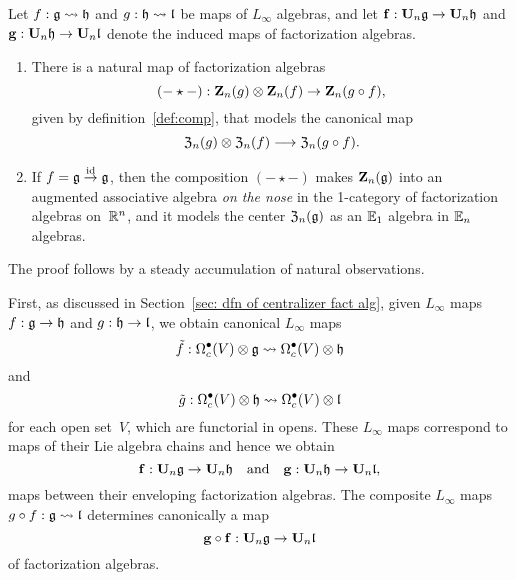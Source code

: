 \documentclass[11pt]{amsart}
\numberwithin{equation}{section}
\begin{document}
\begin{thm}
\label{T:compcentralizer}
Let $f: \mathfrak g \rightsquigarrow \mathfrak h$ and $g: \mathfrak h \rightsquigarrow \mathfrak l$ be maps of  $L_\infty$ algebras,
and let $\bold{f}: \mathbf U_n \mathfrak g \to \mathbf U_n \mathfrak h$ and $\bold{g}: \mathbf U_n \mathfrak h \to \mathbf U_n \mathfrak l$ denote the induced maps of factorization algebras.
\begin{enumerate} 
\item There is a natural map of factorization algebras
\[
(-\star-) : \mathbf Z_n(g) \otimes \mathbf Z_n(f) \to \mathbf Z_n(g \circ f),
\]
given by definition~\ref{def:comp}, 
that models the canonical map 
\[
{\frak Z}_n(g) \otimes {\frak Z}_n(f) \longrightarrow {\frak Z}_n(g\circ f).
\] 
\item If $f= \mathfrak g \stackrel{{\rm id}}\to \mathfrak g$, 
then the composition $(-\star-)$ makes $\mathbf Z_n(\mathfrak g)$ into an 
augmented associative algebra {\em on the nose} in the 1-category of factorization algebras on~$\mathbb R^n$,
and it models the center ${\frak Z}_n(\mathfrak g)$ as an $\mathbb E_1$ algebra in $\mathbb E_n$ algebras.
\end{enumerate}
\end{thm}

The proof follows by a steady accumulation of natural observations.

First, as discussed in Section~\ref{sec: dfn of centralizer fact alg},
given $L_\infty$ maps $f: \mathfrak g \to \mathfrak h$ and $g: \mathfrak h \to \mathfrak l$,
we obtain canonical $L_\infty$ maps
\[
\tilde{f}: \Omega^\bullet_c(V) \otimes \mathfrak g \rightsquigarrow \Omega^\bullet_c(V) \otimes \mathfrak h
\]
and
\[
\tilde{g}: \Omega^\bullet_c(V) \otimes \mathfrak h \rightsquigarrow \Omega^\bullet_c(V) \otimes \mathfrak l
\]
for each open set~$V$,
which are functorial in opens.
These $L_\infty$ maps correspond to maps of their Lie algebra chains and hence we obtain
\[ 
\mathbf{f}: \mathbf U_n \mathfrak g \to  \mathbf U_n \mathfrak h \quad \text{and} \quad \mathbf{g}: \mathbf U_n \mathfrak h \to  \mathbf U_n \mathfrak l,
\]
maps between their enveloping factorization algebras.
The composite $L_\infty$ maps $g \circ f: \mathfrak g \rightsquigarrow \mathfrak l$ determines canonically a map
\[
\mathbf{g \circ f}: \mathbf U_n \mathfrak g \to \mathbf U_n \mathfrak l
\]
of factorization algebras.
\end{document}
